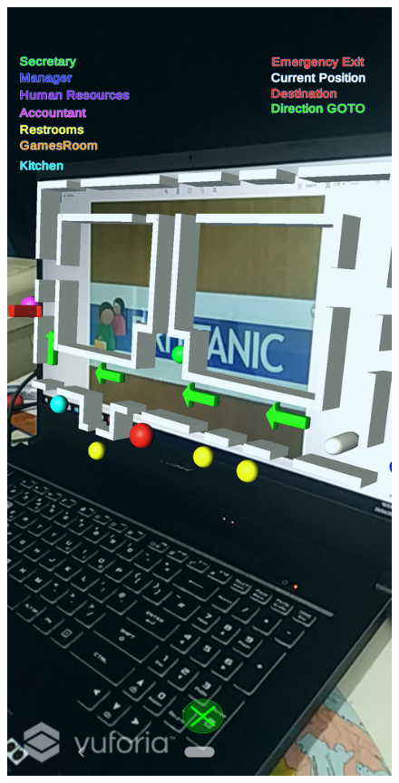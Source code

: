 \documentclass{aifyp}
\begin{document}
\begin{appendices}
\begin{figure}[H]
\begin{minipage}{.5\textwidth}
          \label{fig:MapFrontView}
        \end{minipage}%
        \begin{minipage}{.5\textwidth}
          \centering
          \includegraphics[scale=0.2]{Images/Chapter5/Impl9.png}

\end{minipage}
\end{figure}
\end{appendices}
\end{document}
